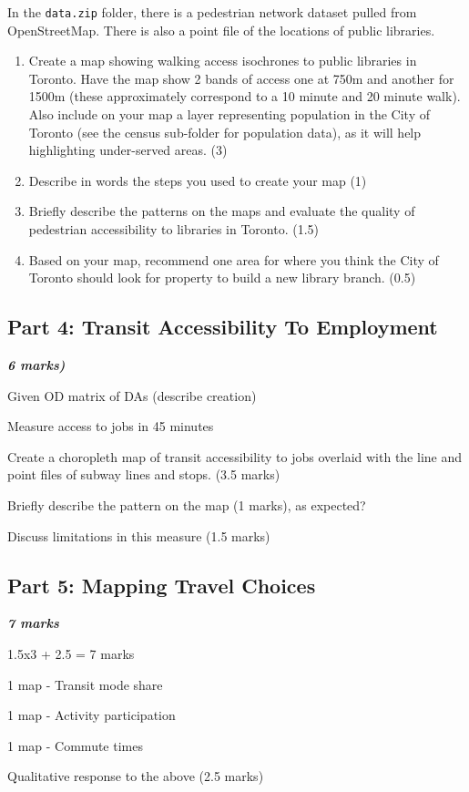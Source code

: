 \documentclass[11pt]{article}
\begin{document}
	In the \texttt{data.zip} folder, there is a pedestrian network dataset pulled from OpenStreetMap. There is also a point file of the locations of public libraries.
	
	
	\begin{enumerate}
		\item Create a map showing walking access isochrones to public libraries in Toronto. Have the map show 2 bands of access one at 750m and another for 1500m (these approximately correspond to a 10 minute and 20 minute walk). Also include on your map a layer representing population in the City of Toronto (see the census sub-folder for population data), as it will help highlighting under-served areas. (3)

		\item Describe in words the steps you used to create your map (1)
		
		\item Briefly describe the patterns on the maps and evaluate the quality of pedestrian accessibility to libraries in Toronto. (1.5)
		
		\item Based on your map, recommend one area for where you think the City of Toronto should look for property to build a new library branch. (0.5)
		
	\end{enumerate}
	
	
	
	\subsection*{Part 4: Transit Accessibility To Employment}
	
	\textbf{\textit{6 marks)}}
	
	
	Given OD matrix of DAs (describe creation)
	
	Measure access to jobs in 45 minutes
	
	Create a choropleth map of transit accessibility to jobs overlaid with the line and point files of subway lines and stops. (3.5 marks)
	
	Briefly describe the pattern on the map (1 marks), as expected?
	
	Discuss limitations in this measure (1.5 marks)
	
	
	
	
	\subsection*{Part 5: Mapping Travel Choices}
	
	\textbf{\textit{7 marks}}
	
	1.5x3 + 2.5 = 7 marks
	
	1 map - Transit mode share
	
	1 map - Activity participation
	
	1 map - Commute times
	
	Qualitative response to the above  (2.5 marks)

	
	
	
	
	
	
\end{document}
